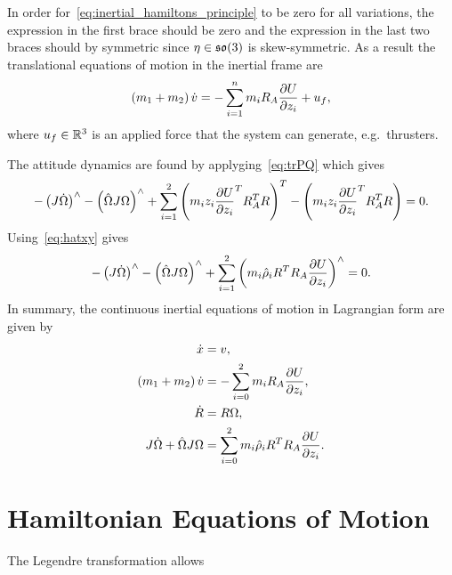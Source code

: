 In order for~\cref{eq:inertial_hamiltons_principle} to be zero for all variations, the expression in the first brace should be zero and the expression in the last two braces should by symmetric since \( \eta \in \mathfrak{so}(3) \) is skew-symmetric.
As a result the translational equations of motion in the inertial frame are
\begin{align*}
    \left( m_1 + m_2 \right) \dot{v} = - \sum_{i=1}^n m_i R_A \frac{\partial U}{\partial z_i} + u_f,
\end{align*}
where \( u_f \in \mathbb{R}^3 \) is an applied force that the system can generate, e.g.\ thrusters.

The attitude dynamics are found by applyging~\cref{eq:trPQ} which gives
\begin{align}
    -\left( J \dot{\Omega} \right)^\wedge - \left(  \hat{\Omega} J \Omega \right)^\wedge + \sum_{i=1}^{2} \left( m_i z_i \frac{\partial U}{\partial z_i}^T R_A^T R  \right)^T - \left( m_i z_i \frac{\partial U}{\partial z_i}^T R_A^T R   \right) = 0.
\end{align}
Using~\cref{eq:hatxy} gives
\begin{align}
    -\left( J \dot{\Omega} \right)^\wedge - \left(  \hat{\Omega} J \Omega \right)^\wedge + \sum_{i=1}^2 \left( m_i \hat{\rho}_i R^T R_A \frac{\partial U}{\partial z_i} \right)^\wedge  = 0.
\end{align}
In summary, the continuous inertial equations of motion in Lagrangian form are given by
\begin{align}
    \dot{x} &= v, \\
    \left( m_1 + m_2 \right) \dot{v} &= - \sum_{i=0}^2 m_i R_A \frac{\partial U}{\partial z_i}, \\
    \dot{R} &= R \Omega, \\
    J \dot{\Omega} + \hat{\Omega} J \Omega &= \sum_{i=0}^2 m_i \hat{\rho}_i R^T R_A \frac{\partial U}{\partial z_i} .
\end{align}

\section{Hamiltonian Equations of Motion}\label{eq:inertial_hamiltonian_eoms}

The Legendre transformation allows 
